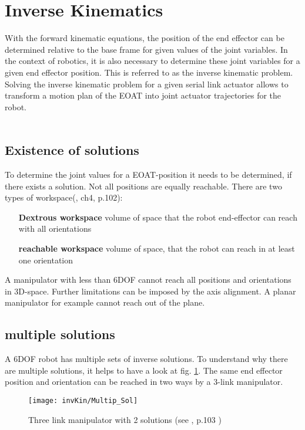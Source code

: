 \section{Inverse Kinematics}

With the forward kinematic equations, the position of the end effector can be determined relative to the base frame for given values of the joint variables.
In the context of robotics, it is also necessary to determine these joint variables for a given end effector position.
This is referred to as the inverse kinematic problem.
Solving the inverse kinematic problem for a given serial link actuator allows to transform a motion plan of the \ac{EOAT} into joint actuator trajectories for the robot.\\
\\
\subsection{Existence of solutions} \label{ExistSol}
To determine the joint values for a \ac{EOAT}-position it needs to be determined, if there exists a solution.
Not all positions are equally reachable.
There are two types of workspace(\cite{craig1986introduction}, ch4, p.102):
\begin{itemize}[wide=\parindent] 
	\item[\textbf{Dextrous workspace}] volume of space that the robot end-effector can reach with all orientations
	\item[\textbf{reachable workspace}] volume of space, that the robot can reach in at least one orientation
\end{itemize}


A manipulator with less than 6\ac{DOF} cannot reach all positions and orientations in 3D-space. Further limitations can be imposed by the axis alignment. A planar manipulator for example cannot reach  out of the plane. \cite{craig1986introduction}

\subsection{multiple solutions} \label{MultipSol}
A 6\ac{DOF} robot has multiple sets of inverse solutions. To understand why there are multiple solutions, it helps to have a look at fig. \ref{fig:multipSol3Link}. The same end effector position and orientation can be reached in two ways by a 3-link manipulator. 

\begin{figure}[H]
	\texttt{[image: invKin/Multip\_Sol]}
	\caption{Three link manipulator with 2 solutions (see \cite{craig1986introduction}, p.103 )}
	\label{fig:multipSol3Link}
\end{figure}

